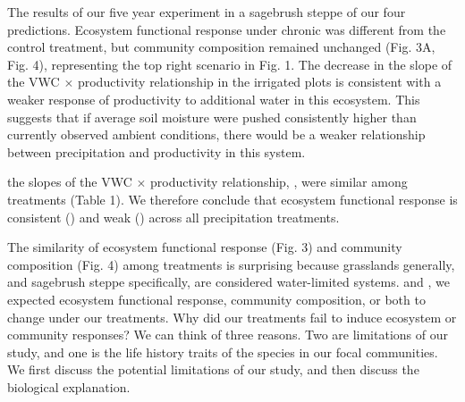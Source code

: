 \documentclass[fleqn,10pt,lineno]{wlpeerj} %
\begin{document}
The results of our five year experiment in a sagebrush steppe
 of our four predictions. Ecosystem functional
response under chronic  was different from
the control treatment, but community composition remained unchanged
(Fig. 3A, Fig. 4), representing the top right scenario in Fig. 1. The
decrease in the slope of the VWC \(\times\) productivity relationship in
the irrigated plots is consistent with a weaker response of productivity
to additional water in this ecosystem. This suggests that if average
soil moisture were pushed consistently higher than currently observed
ambient conditions, there would be a weaker relationship between
precipitation and productivity in this system.

 the slopes of the VWC
\(\times\) productivity relationship, , were
similar among treatments (Table 1). We therefore conclude that ecosystem
functional response is consistent () and weak
() across all precipitation
treatments.

The similarity of ecosystem functional response (Fig. 3) and community
composition (Fig. 4) among treatments is surprising because grasslands
generally, and sagebrush steppe specifically, are considered
water-limited systems.  \citet{Huxman2004} and
\citet{Knapp2015}
\citet{Wilcox2017}
, we expected ecosystem functional
response, community composition, or both to change under our treatments.
Why did our treatments fail to induce ecosystem or community responses?
We can think of three reasons. Two are limitations of our study, and one
is the life history traits of the species in our focal communities. We
first discuss the potential limitations of our study, and then discuss
the biological explanation.
\end{document}
